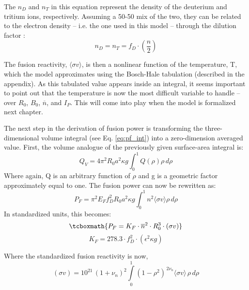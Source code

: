 The $n_D$ and $n_T$ in this equation represent the density of the deuterium and tritium ions, respectively. Assuming a 50-50 mix of the two, they can be related to the electron density -- i.e. the one used in this model -- through the dilution factor :
 \begin{equation}
 	n_D = n_T = f_D \cdot \left( \frac{n}{2} \right)
 \end{equation}
 
 The fusion reactivity, $\langle \sigma v \rangle$, is then a nonlinear function of the temperature, T, which the model approximates using the Bosch-Hale tabulation (described in the appendix). As this tabulated value appears inside an integral, it seems important to point out that the temperature is now the most difficult  variable to handle -- over $R_0$, $B_0$, $\overline n$, and $I_P$. This will come into play when the model is formalized next chapter.
 
 The next step in the derivation of fusion power is transforming the three-dimensional volume integral (see Eq. \ref{eq:pf_int}) into a zero-dimension averaged value. First, the volume analogue of the previously given surface-area integral is:
 \begin{equation}
  	\label{eq:qv}
 	Q_V = 4 \pi^2 R_0 a^2 \kappa g \int_0^1 Q(\rho) \rho \, d\rho
 \end{equation}
 Where again, Q is an arbitrary function of $\rho$ and g is a geometric factor approximately equal to one. The fusion power can now be rewritten as:
 \begin{equation}
 	P_F = \pi^2 E_F f_D^2 R_0 a^2 \kappa g \int_0^1 n^2 \langle \sigma v \rangle \rho \, d\rho
 \end{equation}
In standardized units, this becomes:
\begin{equation}
	\label{eq:pf}
	\tcboxmath{
	P_F = K_F \cdot \overline{n}^2 \cdot R_0^3  \cdot (\sigma v)
	}
\end{equation}
\begin{equation}
  K_F = 278.3 \cdot f_D^2 \cdot ( \epsilon^2 \kappa g )
\end{equation}

Where the standardized fusion reactivity is now,
\begin{equation}
   (\sigma v) = 10^{21} \, (1+\nu_n)^2 \int\limits_0^1 ( 1 - \rho^2 ) ^ { \, 2 \nu_n} \langle \sigma v \rangle \, \rho \, d\rho
\end{equation}

